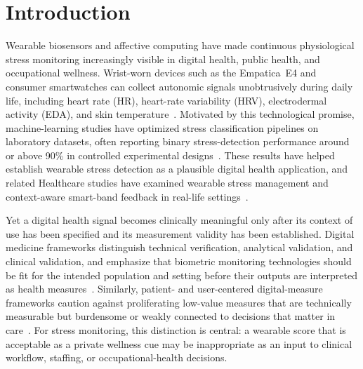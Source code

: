 \documentclass[healthcare,article,submit,moreauthors,pdftex]{Definitions/mdpi}
\begin{document}
\section{Introduction}

Wearable biosensors and affective computing have made continuous physiological
stress monitoring increasingly visible in digital health, public health, and
occupational wellness. Wrist-worn devices such as the Empatica~E4 and consumer
smartwatches can collect autonomic signals unobtrusively during daily life,
including heart rate (HR), heart-rate variability (HRV), electrodermal activity
(EDA), and skin temperature~\cite{can2019survey,schmidt2019review}. Motivated by
this technological promise, machine-learning studies have optimized stress
classification pipelines on laboratory datasets, often reporting binary
stress-detection performance around or above 90\% in controlled experimental
designs~\cite{schmidt2018wesad,gjoreski2017wrist,siirtola2020}. These results
have helped establish wearable stress detection as a plausible digital health
application, and related Healthcare studies have examined wearable stress
management and context-aware smart-band feedback in real-life
settings~\cite{gonzalezramirez2023wearablesstress,can2020relax}.

Yet a digital health signal becomes clinically meaningful only after its context
of use has been specified and its measurement validity has been established.
Digital medicine frameworks distinguish technical verification, analytical
validation, and clinical validation, and emphasize that biometric monitoring
technologies should be fit for the intended population and setting before their
outputs are interpreted as health measures~\cite{goldsack2020v3}. Similarly,
patient- and user-centered digital-measure frameworks caution against
proliferating low-value measures that are technically measurable but burdensome or
weakly connected to decisions that matter in care~\cite{manta2020digitalmeasures}.
For stress monitoring, this distinction is central: a wearable score that is
acceptable as a private wellness cue may be inappropriate as an input to clinical
workflow, staffing, or occupational-health decisions.
\end{document}

